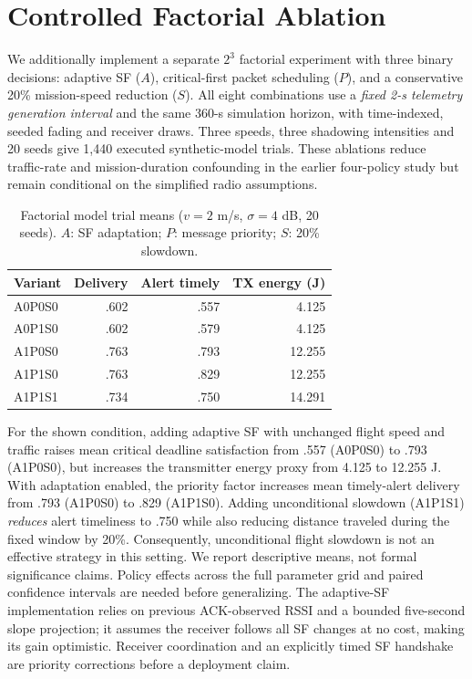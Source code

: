 \documentclass[conference]{IEEEtran}
\begin{document}
\section{Controlled Factorial Ablation}
We additionally implement a separate $2^3$ factorial experiment with three binary decisions: adaptive SF ($A$), critical-first packet scheduling ($P$), and a conservative 20\% mission-speed reduction ($S$). All eight combinations use a \emph{fixed 2-s telemetry generation interval} and the same 360-s simulation horizon, with time-indexed, seeded fading and receiver draws. Three speeds, three shadowing intensities and 20 seeds give 1,440 executed synthetic-model trials. These ablations reduce traffic-rate and mission-duration confounding in the earlier four-policy study but remain conditional on the simplified radio assumptions.
\begin{table}[t]\centering\caption{Factorial model trial means ($v=2$ m/s, $\sigma=4$ dB, 20 seeds). $A$: SF adaptation; $P$: message priority; $S$: 20\% slowdown.}\label{tab:factorial}
\begin{tabular}{lrrr}\toprule
Variant & Delivery & Alert timely & TX energy (J)\\\midrule
A0P0S0 & .602 & .557 & 4.125\\
A0P1S0 & .602 & .579 & 4.125\\
A1P0S0 & .763 & .793 & 12.255\\
A1P1S0 & .763 & .829 & 12.255\\
A1P1S1 & .734 & .750 & 14.291\\
\bottomrule\end{tabular}\end{table}
For the shown condition, adding adaptive SF with unchanged flight speed and traffic raises mean critical deadline satisfaction from .557 (A0P0S0) to .793 (A1P0S0), but increases the transmitter energy proxy from 4.125 to 12.255 J. With adaptation enabled, the priority factor increases mean timely-alert delivery from .793 (A1P0S0) to .829 (A1P1S0). Adding unconditional slowdown (A1P1S1) \emph{reduces} alert timeliness to .750 while also reducing distance traveled during the fixed window by 20\%. Consequently, unconditional flight slowdown is not an effective strategy in this setting. We report descriptive means, not formal significance claims. Policy effects across the full parameter grid and paired confidence intervals are needed before generalizing.
The adaptive-SF implementation relies on previous ACK-observed RSSI and a bounded five-second slope projection; it assumes the receiver follows all SF changes at no cost, making its gain optimistic. Receiver coordination and an explicitly timed SF handshake are priority corrections before a deployment claim.
\end{document}
